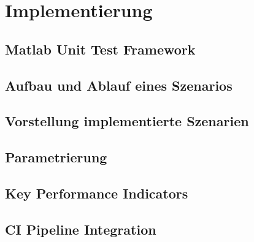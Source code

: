 \chapter{Implementierung} \label{chap:Implementierung}
\thispagestyle{empty}

\section{Matlab Unit Test Framework} \label{sec:MatlabUnitTest}

\section{Aufbau und Ablauf eines Szenarios} \label{sec:AufbauSzenario}

\section{Vorstellung implementierte Szenarien} \label{sec:Vorstellung Szenarien}

\section{Parametrierung} \label{sec:Parametrierung}

\section{Key Performance Indicators} \label{sec:KPI}

\section{CI Pipeline Integration} \label{sec:CIPipeline}













